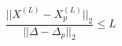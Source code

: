 \documentclass{article}
\begin{document}
\color{customcolor}

$$
\frac{||X^{(L)} - X^{(L)}_p||_2}{||\Delta - \Delta_p||_2} \leq L
$$
\end{document}
